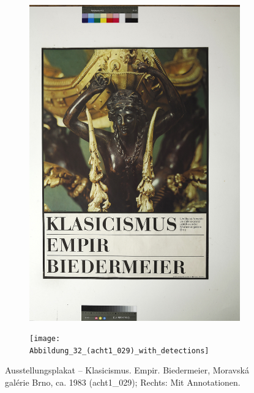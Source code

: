 \documentclass[a4paper,12pt,ngerman]{article}
\begin{document}
\newpage
\begin{landscape}
\begin{figure}[ht]
	\begin{subfigure}[b]{0.5\linewidth}
	\centering
	\includegraphics[height=\linewidth]{Abbildung_36_(acht1_029)}
	\end{subfigure}
	\begin{subfigure}[b]{0.5\linewidth}
	\centering
	\texttt{[image: Abbildung\_32\_(acht1\_029)\_with\_detections]}
	\end{subfigure}
	\caption{Ausstellungsplakat – Klasicismus. Empir. Biedermeier, Moravská galérie Brno, ca. 1983 (acht1\_029); Rechts: Mit Annotationen.}
\end{figure}
\end{landscape}
\end{document}
